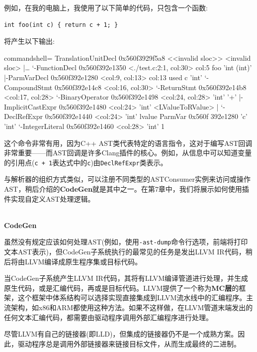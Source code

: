例如，在我的电脑上，我使用了以下简单的代码，只包含一个函数:

\begin{lstlisting}[style=styleCXX]
int foo(int c) { return c + 1; }
\end{lstlisting}

将产生以下输出:

\begin{tcblisting}{commandshell={}}
TranslationUnitDecl 0x560f3929f5a8 <<invalid sloc>> <invalid
sloc>
|…
`-FunctionDecl 0x560f392e1350 <./test.c:2:1, col:30> col:5 foo
'int (int)'
  |-ParmVarDecl 0x560f392e1280 <col:9, col:13> col:13 used c
'int'
  `-CompoundStmt 0x560f392e14c8 <col:16, col:30>
    `-ReturnStmt 0x560f392e14b8 <col:17, col:28>
      `-BinaryOperator 0x560f392e1498 <col:24, col:28> 'int' '+'
        |-ImplicitCastExpr 0x560f392e1480 <col:24> 'int' <LValueToRValue>
        |   `-DeclRefExpr 0x560f392e1440 <col:24> 'int' lvalue ParmVar 0x560f
              392e1280 'c' 'int'
        `-IntegerLiteral 0x560f392e1460 <col:28> 'int' 1
\end{tcblisting}

这个命令非常有用，因为C++ AST类代表特定的语言指令，这对于编写AST回调非常重要——而AST回调是许多Clang插件的核心。例如，从信息中可以知道变量的引用点(\texttt{c + 1}表达式中的\texttt{c})由\texttt{DeclRefExpr}类表示。

与解析器的组织方式类似，可以注册不同类型的ASTConsumer实例来访问或操作AST，稍后介绍的\textbf{CodeGen}就是其中之一。在第7章中，我们将展示如何使用插件实现自定义AST处理逻辑。

\hspace*{\fill} \\ %
\noindent
\textbf{CodeGen}

虽然没有规定应该如何处理AST(例如，使用\texttt{-ast-dump}命令行选项，前端将打印文本AST表示)，但CodeGen子系统执行的最常见的任务是发出LLVM IR代码，稍后将由LLVM编译成原生程序集或目标代码。


当CodeGen子系统产生LLVM IR代码，其将有LLVM编译管道进行处理，并生成原生代码，或是汇编代码，再或是目标代码。LLVM提供了一个称为\textbf{MC层}的框架，这个框架中体系结构可以选择实现直接集成到LLVM流水线中的汇编程序。主流架构，如x86和ARM都使用这种方法。如果不这样做，在LLVM管道末端发出的任何文本汇编代码，都需要由驱动程序调用外部汇编程序进行处理。

尽管LLVM有自己的链接器(即LLD)，但集成的链接器仍不是一个成熟方案。因此，驱动程序总是调用外部链接器来链接目标文件，从而生成最终的二进制。

